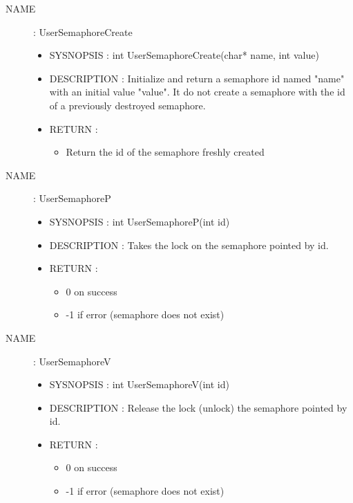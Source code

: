 \documentclass[a4paper,10pt]{article}
\begin{document}
\begin{description}
    \item [NAME] : UserSemaphoreCreate
        \begin{itemize}
            \item SYSNOPSIS : int UserSemaphoreCreate(char* name, int value)
            \item DESCRIPTION :
                Initialize and return a semaphore id named "name" with an initial value "value".
                It do not create a semaphore with the id of a previously destroyed semaphore.
            \item RETURN :
                \begin{itemize}
                    \item Return the id of the semaphore freshly created
                \end{itemize}
        \end{itemize}

    \item [NAME] : UserSemaphoreP
        \begin{itemize}
            \item SYSNOPSIS : int UserSemaphoreP(int id)
            \item DESCRIPTION :
                Takes the lock on the semaphore pointed by id.
            \item RETURN :
                \begin{itemize}
                    \item 0 on success
                    \item -1 if error (semaphore does not exist)
                \end{itemize}
        \end{itemize}

    \item [NAME] : UserSemaphoreV
        \begin{itemize}
            \item SYSNOPSIS : int UserSemaphoreV(int id)
            \item DESCRIPTION :
                Release the lock (unlock) the semaphore pointed by id.
            \item RETURN :
                \begin{itemize}
                    \item 0 on success
                    \item -1 if error (semaphore does not exist)
                \end{itemize}
        \end{itemize}


\end{description}
\end{document}
